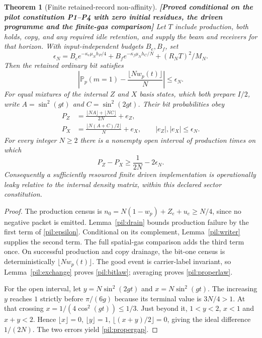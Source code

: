 \documentclass[11pt,a4paper]{article}
\newtheorem{theorem}{Theorem}[section]
\theoremstyle{definition}
\theoremstyle{remark}\newtheorem{remark}[theorem]{Remark}
\newcommand{\status}[1]{\textbf{[#1]}\quad}
\begin{document}
\begin{theorem}[Finite retained-record non-affinity]\label{pil:retained}
\status{Proved conditional on the pilot constitution P1--P4 with zero initial residues, the driven programme and the finite-gas comparison}
Let $T$ include production, both holds, copy, and any required idle retention, and supply the beam and receivers for that horizon. With input-independent budgets $B_e,B_f$, set
\begin{equation}\label{pil:epsilon}
 \epsilon_N=B_e e^{-\kappa_e\mu_N h_P/4}
             +B_f e^{-\kappa_f\mu_N h_C/N}
             +(R_NT)^2/M_N.
\end{equation}
Then the retained ordinary bit satisfies
\begin{equation}\label{pil:bitlaw}
 \left|\mathbb P_p(m=1)-\frac{\lfloor Nw_p(t)\rfloor}{N}\right|\le\epsilon_N.
\end{equation}
For equal mixtures of the internal $Z$ and $X$ basis states, which both prepare $I/2$, write $A=\sin^2(gt)$ and $C=\sin^2(2gt)$. Their bit probabilities obey
\begin{align}\label{pil:properlaw}
 P_Z&=\frac{\lfloor NA\rfloor+\lfloor NC\rfloor}{2N}+e_Z,\\
 P_X&=\frac{\lfloor N(A+C)/2\rfloor}{N}+e_X,
 \qquad |e_Z|,|e_X|\le\epsilon_N.\nonumber
\end{align}
For every integer $N\ge2$ there is a nonempty open interval of production times on which
\begin{equation}\label{pil:propergap}
 P_Z-P_X\ge\frac1{2N}-2\epsilon_N.
\end{equation}
Consequently a sufficiently resourced finite driven implementation is operationally leaky relative to the internal density matrix, within this declared sector constitution.
\end{theorem}
\begin{proof}
The production census is $n_0=N(1-w_p)+Z_e+u_e\ge N/4$, since no negative packet is emitted. Lemma~\ref{pil:drain} bounds production failure by the first term of \eqref{pil:epsilon}. Conditional on its complement, Lemma~\ref{pil:writer} supplies the second term. The full spatial-gas comparison adds the third term once. On successful production and copy drainage, the bit-one census is deterministically $\lfloor Nw_p(t)\rfloor$. The good event is carrier-label invariant, so Lemma~\ref{pil:exchange} proves \eqref{pil:bitlaw}; averaging proves \eqref{pil:properlaw}.

For the open interval, let $y=N\sin^2(2gt)$ and $x=N\sin^2(gt)$. The increasing $y$ reaches $1$ strictly before $\pi/(6g)$ because its terminal value is $3N/4>1$. At that crossing $x=1/(4\cos^2(gt))\le1/3$. Just beyond it, $1<y<2$, $x<1$ and $x+y<2$. Hence $\lfloor x\rfloor=0$, $\lfloor y\rfloor=1$, $\lfloor(x+y)/2\rfloor=0$, giving the ideal difference $1/(2N)$. The two errors yield \eqref{pil:propergap}.
\end{proof}
\end{document}
